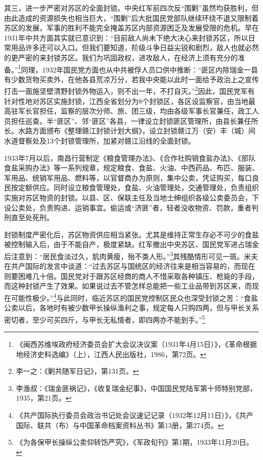 其三，进一步严密对苏区的全面封锁。中央红军前四次反“围剿”虽然均获胜利，但由此造成的资源损失也相当巨大，“围剿”后大批国民党部队继续环绕不退又限制着苏区的发展，军事的胜利不能完全掩盖苏区内部资源困乏及发展受限的危机。早在1931年中共方面其实就已意识到：“目前敌人尚未下绝大决心来封锁苏区，所以日常用品许多还可以入口。但我们要知道，阶级斗争日益尖锐和剧烈，敌人也就必然的更严密的来封锁苏区。我们为巩固政权，进攻敌人，在经济上须有充分的准备。”\footnote{《闽西苏维埃政府经济委员会扩大会议决议案（1931年4月15日）》，《革命根据地经济史料选编》（上），江西人民出版社，1986，第72页。}同理，1932年国民党方面也从中共被俘人员口供中推断：“匪区内除瑞金一县有少数货物买卖外，在他各县荒凉万分，若我中央能以此时一面给予政治上之宣传打击一面施坚壁清野封锁外物运入，则不出一年，不打自灭。”\footnote{李一之：《剿共随军日记》，第131页。}因此，国民党军有针对性地对苏区实施封锁，江西全省划分为8个封锁区，各区设监察官，由当地最高驻军长官担任，监察的层次分师、旅、团三级，均由各级军事长官兼任，政工人员担任巡查。半“匪区”、邻“匪区”各县，一律设立封锁匪区管理所，由县长兼任所长。水路方面颁布《整理赣江封锁计划大纲》，设立封锁赣江万（安）丰（城）间水道督察处及13个封锁管理所，加紧对赣江沿线的全面封锁。


1933年7月以后，南昌行营制定《粮食管理办法》、《合作社购销食盐办法》、《部队食盐采购办法》等一系列规章，规定粮食、食盐、火油、中西药品、布匹、服装、军用品、统销军用品、燃料等，以官督商办为原则，集中公卖，凭证购买，每口良民按定额供应。同时设立粮食管理处，食盐、火油管理处，交通管理处，负责组织实施对苏区物资的封锁。以县、区、保联主任及当地士绅组织各级公卖委员会，下设公卖处，负责购进、运销事宜。偷运或“济匪”者，轻者没收物资、罚款，重者判刑直至处死刑。


封锁制度严密化后，苏区物资供应相当紧张。尤其是维持正常生存必不可少的食盐被控制输入后，由于不能自产，极度紧缺。红军撤出中央苏区、国民党军进占瑞金后注意到：“居民食淡过久，肌肉黄瘦，殆不类人形。”\footnote{李渔叔：《瑞金匪祸记》，《收复瑞金纪事》，中国国民党陆军第十师特别党部，1935，第21页。}其残酷情形可见一斑。米夫在共产国际的发言中谈道：“过去苏区与国统区的经济往来是相当容易的，而现在则要困难几十倍。国民党对于跟苏区经商的商人不惜采取各种镇压、枪毙的手段，而这种封锁产生了效果。如果说过去不管怎样总能把一些工业品带到苏区来，而现在可能性极少。”\footnote{《共产国际执行委员会政治书记处会议速记记录（1932年12月11日）》，《共产国际、联共（布）与中国革命档案资料丛书》第13册，第274页。}与此同时，临近苏区的国民党控制区民众也深受封锁之苦：“食盐公卖以后，各地时有被少数甲长操纵渔利之事，规定每人只购四两，但与甲长关系密切者，至少可买四斤，与甲长无私情者，即四两亦不能到手。”\footnote{《为各保甲长操纵公卖仰转饬严究》，《军政旬刊》第1期，1933年11月20日。}


